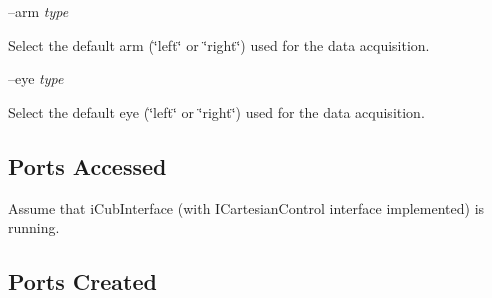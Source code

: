 --arm {\itshape type} 
\begin{DoxyItemize}
\item Select the default arm (\char`\"{}left\char`\"{} or \char`\"{}right\char`\"{}) used for the data acquisition.
\end{DoxyItemize}

--eye {\itshape type} 
\begin{DoxyItemize}
\item Select the default eye (\char`\"{}left\char`\"{} or \char`\"{}right\char`\"{}) used for the data acquisition.
\end{DoxyItemize}\hypertarget{group__karmaToolFinder_portsa_sec}{}\subsection{Ports Accessed}\label{group__karmaToolFinder_portsa_sec}
Assume that i\+Cub\+Interface (with I\+Cartesian\+Control interface implemented) is running.\hypertarget{group__karmaToolProjection_portsc_sec}{}\subsection{Ports Created}\label{group__karmaToolProjection_portsc_sec}


